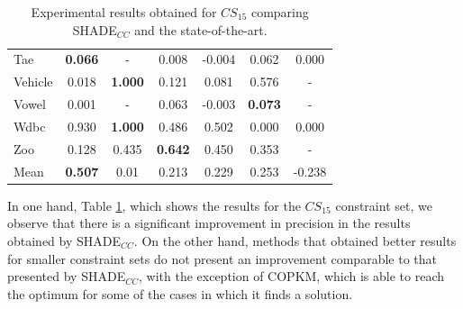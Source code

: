 \documentclass[review]{elsarticle}
\begin{document}
\begin{table}[!h]
{\begin{tabular}{lcccccc}
			Tae & \textbf{0.066} & - & 0.008 & -0.004 & 0.062 & 0.000 \\
			Vehicle & 0.018 & \textbf{1.000} & 0.121 & 0.081 & 0.576 & - \\
			Vowel & 0.001 & - & 0.063 & -0.003 & \textbf{0.073} & - \\
			Wdbc & 0.930 & \textbf{1.000} & 0.486 & 0.502 & 0.000 & 0.000 \\
			Zoo & 0.128 & 0.435 & \textbf{0.642} & 0.450 & 0.353 & - \\
			\hline
			Mean  & \textbf{0.507} & 0.01 & 0.213 & 0.229 & 0.253 & -0.238 \\
			\hline
		\end{tabular}}
		
	\caption{Experimental results obtained for $CS_{15}$ comparing SHADE$_{CC}$ and the state-of-the-art.}
	\label{tab:results15SOTA}
\end{table}

In one hand, Table \ref{tab:results15SOTA}, which shows the results for the $CS_{15}$ constraint set, we observe that there is a significant improvement in precision in the results obtained by SHADE$_{CC}$. On the other hand, methods that obtained better results for smaller constraint sets do not present an improvement comparable to that presented by SHADE$_{CC}$, with the exception of COPKM, which is able to reach the optimum for some of the cases in which it finds a solution.
\end{document}
